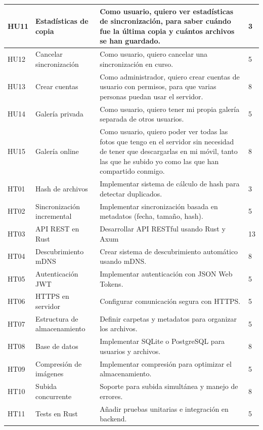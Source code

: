 \begin{tabularx}{\textwidth}{|l|l|>{\raggedright\arraybackslash}X|l|}
    \hline
    HU11 & Estadísticas de copia & Como usuario, quiero ver estadísticas de sincronización, para saber cuándo fue la última copia y cuántos archivos se han guardado. & 3 \\
    \hline
    HU12 & Cancelar sincronización & Como usuario, quiero cancelar una sincronización en curso. & 5 \\
    \hline
    HU13 & Crear cuentas & Como administrador, quiero crear cuentas de usuario con permisos, para que varias personas puedan usar el servidor. & 8 \\
    \hline
    HU14 & Galería privada & Como usuario, quiero tener mi propia galería separada de otros usuarios. & 5 \\
    \hline
    HU15 & Galería online & Como usuario, quiero poder ver todas las fotos que tengo en el servidor sin necesidad de tener que descargarlas en mi móvil, tanto las que he subido yo como las que han compartido conmigo. & 8 \\
    \hline
    HT01 & Hash de archivos & Implementar sistema de cálculo de hash para detectar duplicados. & 3 \\
    \hline
    HT02 & Sincronización incremental & Implementar sincronización basada en metadatos (fecha, tamaño, hash). & 5 \\
    \hline
    HT03 & API REST en Rust & Desarrollar API RESTful usando Rust y Axum & 13 \\
    \hline
    HT04 & Descubrimiento mDNS & Crear sistema de descubrimiento automático usando mDNS. & 8 \\
    \hline
    HT05 & Autenticación JWT & Implementar autenticación con JSON Web Tokens. & 5 \\
    \hline
    HT06 & HTTPS en servidor & Configurar comunicación segura con HTTPS. & 5 \\
    \hline
    HT07 & Estructura de almacenamiento & Definir carpetas y metadatos para organizar los archivos. & 5 \\
    \hline
    HT08 & Base de datos & Implementar SQLite o PostgreSQL para usuarios y archivos. & 8 \\
    \hline
    HT09 & Compresión de imágenes & Implementar compresión para optimizar el almacenamiento. & 5 \\
    \hline
    HT10 & Subida concurrente & Soporte para subida simultánea y manejo de errores. & 8 \\
    \hline
    HT11 & Tests en Rust & Añadir pruebas unitarias e integración en backend. & 5 \\

\end{tabularx}
